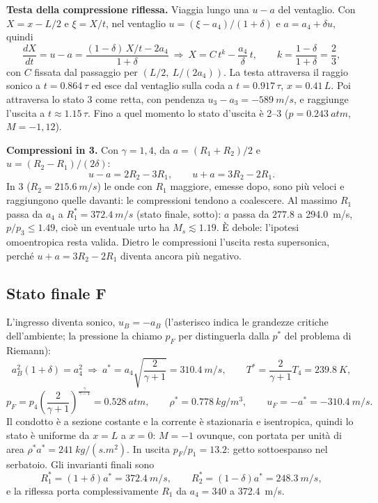 \documentclass[11pt,a4paper]{article}
\newcommand{\uma}{u-a}
\newcommand{\Ms}{M_{s}}
\begin{document}
\textbf{Testa della compressione riflessa.} Viaggia lungo una $\uma$ del ventaglio. Con $X=x-L/2$ e $\xi=X/t$,
nel ventaglio $u=(\xi-a_4)/(1+\delta)$ e $a=a_4+\delta u$, quindi
\[
\frac{dX}{dt}=u-a=\frac{(1-\delta)\,X/t-2a_4}{1+\delta}
\ \Rightarrow\
X=C\,t^{k}-\frac{a_4}{\delta}\,t,\qquad k=\frac{1-\delta}{1+\delta}=\frac23 ,
\]
con $C$ fissata dal passaggio per $(L/2,\ L/(2a_4))$. La testa attraversa il raggio sonico a $t=\num{0.864}\,\tau$ ed
esce dal ventaglio sulla coda a $t=\num{0.917}\,\tau$, $x=\num{0.41}\,L$. Poi attraversa lo stato 3 come retta, con
pendenza $u_3-a_3=\SI{-589}{m/s}$, e raggiunge l'uscita a $t\approx\num{1.15}\,\tau$. Fino a quel momento lo stato
d'uscita è 2--3 ($p=\SI{0.243}{atm}$, $M=-1{,}12$).

\textbf{Compressioni in 3.} Con $\gamma=1{,}4$, da $a=(R_1+R_2)/2$ e $u=(R_2-R_1)/(2\delta)$:
\[
u-a=2R_2-3R_1,\qquad u+a=3R_2-2R_1 .
\]
In 3 ($R_2=\SI{215.6}{m/s}$) le onde con $R_1$ maggiore, emesse dopo, sono più veloci e raggiungono quelle davanti:
le compressioni tendono a coalescere. Al massimo $R_1$ passa da $a_4$ a $R_1^*=\SI{372.4}{m/s}$ (stato
finale, sotto): $a$ passa da $\num{277.8}$ a \SI{294.0}{m/s}, $p/p_3\le\num{1.49}$, cioè un eventuale urto ha
$\Ms\lesssim\num{1.19}$. È debole: l'ipotesi omoentropica resta valida. Dietro le compressioni l'uscita resta
supersonica, perché $u+a=3R_2-2R_1$ diventa ancora più negativo.

\subsection*{Stato finale F}
L'ingresso diventa sonico, $u_B=-a_B$ (l'asterisco indica le grandezze critiche dell'ambiente; la pressione la
chiamo $p_F$ per distinguerla dalla $p^*$ del problema di Riemann):
\[
a_B^2(1+\delta)=a_4^2\ \Rightarrow\ a^*=a_4\sqrt{\frac{2}{\gamma+1}}=\SI{310.4}{m/s},\qquad
T^*=\frac{2}{\gamma+1}T_4=\SI{239.8}{K},
\]
\[
p_F=p_4\left(\frac{2}{\gamma+1}\right)^{\frac{\gamma}{\gamma-1}}=\SI{0.528}{atm},\qquad
\rho^*=\SI{0.778}{kg/m^3},\qquad u_F=-a^*=\SI{-310.4}{m/s}.
\]
Il condotto è a sezione costante e la corrente è stazionaria e isentropica, quindi lo stato è uniforme da $x=L$ a
$x=0$: $M=-1$ ovunque, con portata per unità di area $\rho^*a^*=\SI{241}{kg/(s.m^2)}$. In uscita
$p_F/p_1=\num{13.2}$: getto sottoespanso nel serbatoio. Gli invarianti finali sono
\[
R_1^*=(1+\delta)a^*=\SI{372.4}{m/s},\qquad R_2^*=(1-\delta)a^*=\SI{248.3}{m/s},
\]
e la riflessa porta complessivamente $R_1$ da $a_4=\num{340}$ a \SI{372.4}{m/s}.
\end{document}
